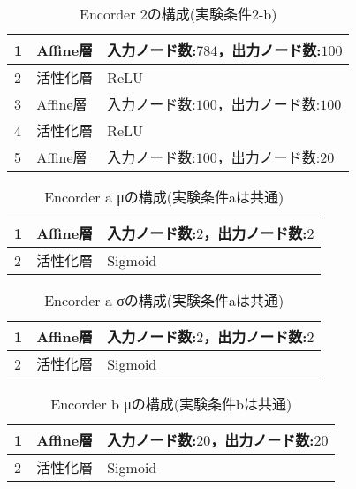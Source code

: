 \documentclass[12pt]{jsarticle}
\begin{document}
\begin{table}[hbt]
\begin{center}
\caption{Encorder 2の構成(実験条件2-b)}
\label{table:Encorder1}
\begin{tabularx}{0.9\linewidth}{|l|l|X|}
\hline
1 & Affine層 & 入力ノード数:$784$，出力ノード数:$100$ \\
\hline
2 & 活性化層 & ReLU \\
\hline
3 & Affine層 & 入力ノード数:$100$，出力ノード数:$100$ \\
\hline
4 & 活性化層 & ReLU　\\
\hline
5 & Affine層 & 入力ノード数:$100$，出力ノード数:$20$ \\
\hline
\end{tabularx}
\end{center}
\end{table}

\begin{table}[hbt]
\begin{center}
\caption{Encorder a μの構成(実験条件aは共通)}
\label{table:Encorder mu-1}
\begin{tabularx}{0.9\linewidth}{|l|l|X|}
\hline
1 & Affine層 & 入力ノード数:$2$，出力ノード数:$2$ \\
\hline
2 & 活性化層 & Sigmoid \\
\hline
\end{tabularx}
\end{center}
\end{table}

\begin{table}[hbt]
\begin{center}
\caption{Encorder a σの構成(実験条件aは共通)}
\label{table:Encorder sigma-1}
\begin{tabularx}{0.9\linewidth}{|l|l|X|}
\hline
1 & Affine層 & 入力ノード数:$2$，出力ノード数:$2$ \\
\hline
2 & 活性化層 & Sigmoid \\
\hline
\end{tabularx}
\end{center}
\end{table}


\begin{table}[hbt]
\begin{center}
\caption{Encorder b μの構成(実験条件bは共通)}
\label{table:Encorder mu-1}
\begin{tabularx}{0.9\linewidth}{|l|l|X|}
\hline
1 & Affine層 & 入力ノード数:$20$，出力ノード数:$20$ \\
\hline
2 & 活性化層 & Sigmoid \\
\hline
\end{tabularx}
\end{center}
\end{table}
\end{document}
